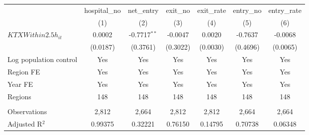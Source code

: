 \begingroup
\centering
\begin{tabular}{lcccccc}
   \toprule
                          & hospital\_no  & net\_entry     & exit\_no  & exit\_rate  & entry\_no  & entry\_rate \\    
                          & (1)           & (2)            & (3)       & (4)         & (5)        & (6)\\  
   \midrule 
   $KTXWithin2.5h_{it}$   & 0.0002        & -0.7717$^{**}$ & -0.0047   & 0.0020      & -0.7637    & -0.0068\\   
                          & (0.0187)      & (0.3761)       & (0.3022)  & (0.0030)    & (0.4696)   & (0.0065)\\   
   Log population control & Yes           & Yes            & Yes       & Yes         & Yes        & Yes\\  
   Region FE              & Yes           & Yes            & Yes       & Yes         & Yes        & Yes\\  
   Year FE                & Yes           & Yes            & Yes       & Yes         & Yes        & Yes\\  
   Regions                & 148           & 148            & 148       & 148         & 148        & 148\\  
    \\
   Observations           & 2,812         & 2,664          & 2,812     & 2,812       & 2,664      & 2,664\\  
   Adjusted R$^2$         & 0.99375       & 0.32221        & 0.76150   & 0.14795     & 0.70738    & 0.06348\\  
   \bottomrule
\end{tabular}
\par\endgroup

